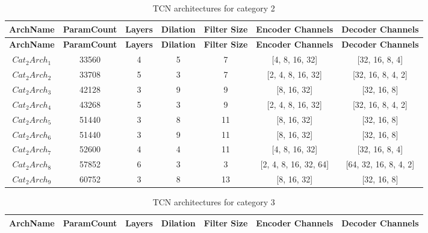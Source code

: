 \documentclass[preprint,12pt]{elsarticle}
\begin{document}
\begin{itemize}
\begin{footnotesize}
\setlength{\tabcolsep}{6pt}
\begin{longtable}{ccccccc}
\caption{TCN architectures for category 2}
\label{tab:cat2}\\
\toprule
\textbf{ArchName} & \textbf{ParamCount} & \textbf{Layers} & \textbf{Dilation} & \textbf{Filter Size} & \textbf{Encoder Channels} & \textbf{Decoder Channels} \\
\midrule
\endfirsthead

\toprule
\textbf{ArchName} & \textbf{ParamCount} & \textbf{Layers} & \textbf{Dilation} & \textbf{Filter Size} & \textbf{Encoder Channels} & \textbf{Decoder Channels} \\
\midrule
\endhead

\endfoot

\bottomrule
\endlastfoot
$Cat_2Arch_1$ & 33560 & 4 & 5 & 7  & [4, 8, 16, 32]        & [32, 16, 8, 4]\\
$Cat_2Arch_2$ & 33708 & 5 & 3 & 7  & [2, 4, 8, 16, 32]     & [32, 16, 8, 4, 2] \\
$Cat_2Arch_3$ & 42128 & 3 & 9 & 9  & [8, 16, 32]           & [32, 16, 8]\\
$Cat_2Arch_4$ & 43268 & 5 & 3 & 9  & [2, 4, 8, 16, 32]     & [32, 16, 8, 4, 2] \\
$Cat_2Arch_5$ & 51440 & 3 & 8 & 11 & [8, 16, 32]           & [32, 16, 8] \\
$Cat_2Arch_6$ & 51440 & 3 & 9 & 11 & [8, 16, 32]           & [32, 16, 8]\\
$Cat_2Arch_7$ & 52600 & 4 & 4 & 11 & [4, 8, 16, 32]        & [32, 16, 8, 4] \\
$Cat_2Arch_8$ & 57852 & 6 & 3 & 3  & [2, 4, 8, 16, 32, 64] & [64, 32, 16, 8, 4, 2] \\
$Cat_2Arch_9$ & 60752 & 3 & 8 & 13 & [8, 16, 32]           & [32, 16, 8]\\
\end{longtable}
\end{footnotesize}

\begin{footnotesize}
\setlength{\tabcolsep}{6pt}
\begin{longtable}{ccccccc}
\caption{TCN architectures for category 3}
\label{tab:cat3}\\
\toprule
\textbf{ArchName} & \textbf{ParamCount} & \textbf{Layers} & \textbf{Dilation} & \textbf{Filter Size} & \textbf{Encoder Channels} & \textbf{Decoder Channels} \\
\midrule
\endfirsthead


\end{longtable}
\end{footnotesize}
\end{itemize}
\end{document}
